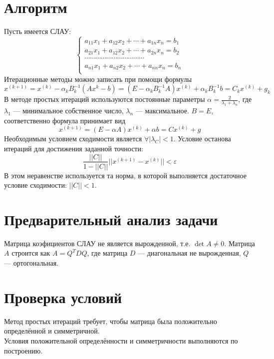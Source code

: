 \documentclass[11pt,a4paper]{article}
\let\epsilon\varepsilon
\renewcommand\;{\hspace{1cm}}
\begin{document}
\section{Алгоритм}
Пусть имеется СЛАУ: \[
  \begin{cases}
    a_{11}x_{1} + a_{12}x_{2} + \cdots + a_{1n}x_{n} = b_{1}\\
    a_{21}x_{1} + a_{12}x_{2} + \cdots + a_{2n}x_{n} = b_{2}\\
    \cdots \cdots \cdots \cdots \cdots \cdots \cdots \cdots \cdots \cdots \cdots  \\
    a_{n1}x_{1} + a_{n2}x_{2} + \cdots + a_{nn}x_{n} = b_{n}\\
  \end{cases}
\]
Итерационные методы можно записать при помощи формулы \[
  x^{(k+1)}=x^{(k)} - \alpha_{k}B_{k}^{-1}(Ax^{k}-b)=(E - \alpha_{k}B^{-1}_{k}A)x^{(k)} + \alpha_{k}B^{-1}_{k}b = C_{k}x^{(k)} + g_{k}
\]
В методе простых итераций используются постоянные параметры $\alpha = \frac{2}{\lambda_{1} + \lambda_{n}}$, где $\lambda_{1}$ --- минимальное собственное число, $\lambda_{n}$ --- максимальное. $B = E$, соответственно формула принимает вид \[
  x^{(k+1)} = (E - \alpha A)x^{(k)} + \alpha b = Cx^{(k)} + g
\]
Необходимым условием сходимости является $ \forall |\lambda_{C}| < 1$.
Условие останова итераций для достижения заданной точности: \[
  \frac{||C||}{1-||C||}||x^{(k+1)}-x^{(k)}|| < \epsilon
\]
В этом неравенстве используется та норма, в которой выполняется достаточное условие сходимости: $||C|| < 1$.
\section{Предварительный анализ задачи}
Матрица коэфициентов СЛАУ не является вырожденной, т.е. $\det{A} \neq 0$. Матрица $A$ строится как $A = Q^{T}DQ$,
где матрица $D$ --- диагональная не вырожденная, $Q$ --- ортогональная.
\section{Проверка условий}
Метод простых итераций требует, чтобы матрица была положительно определённой и симметричной.\\
Условия положительной определённости и симметричности выполняются по построению.
\end{document}
